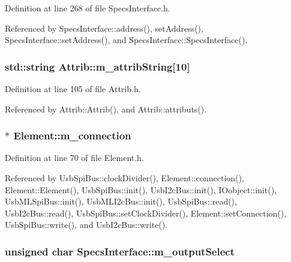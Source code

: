 Definition at line 268 of file SpecsInterface.h.

Referenced by SpecsInterface::address(), setAddress(), SpecsInterface::setAddress(), and SpecsInterface::SpecsInterface().\hypertarget{classAttrib_a3414521d7a82476e874b25a5407b5e63}{
\subsubsection[{m\_\-attribString}]{\setlength{\rightskip}{0pt plus 5cm}std::string {\bf Attrib::m\_\-attribString}\mbox{[}10\mbox{]}}}
\label{classAttrib_a3414521d7a82476e874b25a5407b5e63}


Definition at line 105 of file Attrib.h.

Referenced by Attrib::Attrib(), and Attrib::attributs().\hypertarget{classElement_abe3de7a5dbbc9a6dd2d7e012e5fdb266}{
\subsubsection[{m\_\-connection}]{$\ast$ {\bf Element::m\_\-connection}}}
\label{classElement_abe3de7a5dbbc9a6dd2d7e012e5fdb266}


Definition at line 70 of file Element.h.

Referenced by UsbSpiBus::clockDivider(), Element::connection(), Element::Element(), UsbSpiBus::init(), UsbI2cBus::init(), IOobject::init(), UsbMLSpiBus::init(), UsbMLI2cBus::init(), UsbSpiBus::read(), UsbI2cBus::read(), UsbSpiBus::setClockDivider(), Element::setConnection(), UsbSpiBus::write(), and UsbI2cBus::write().\hypertarget{classSpecsInterface_a660cb4112ce1c071f277cb6ec115b411}{
\subsubsection[{m\_\-outputSelect}]{\setlength{\rightskip}{0pt plus 5cm}unsigned char {\bf SpecsInterface::m\_\-outputSelect}}}
\label{classSpecsInterface_a660cb4112ce1c071f277cb6ec115b411}


